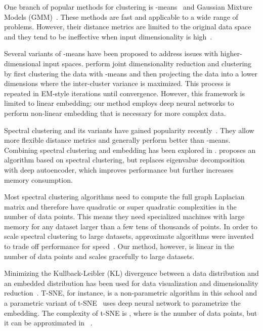 \documentclass{article}
\begin{document}
One branch of popular methods for clustering is -means~\citep{macqueen1967some} and Gaussian Mixture Models (GMM)~\citep{bishop2006pattern}.
These methods are fast and applicable to a wide range of problems.
However, their distance metrics are limited to the original data space and they tend to be ineffective when input dimensionality is high~\citep{steinbach2004challenges}.

Several variants of -means have been proposed to address issues with higher-dimensional input spaces.
\citet{de2006discriminative,ye2008discriminative} perform joint dimensionality reduction and clustering by first clustering the data with -means and then projecting the data into a lower dimensions where the inter-cluster variance is maximized.
This process is repeated in EM-style iterations until convergence.
However, this framework is limited to linear embedding; our method employs deep neural networks to perform non-linear embedding that is necessary for more complex data.

Spectral clustering and its variants have gained popularity recently~\citep{von2007tutorial}.
They allow more flexible distance metrics and generally perform better than -means.
Combining spectral clustering and embedding has been explored in \citet{yang2010image,nie2011spectral}.
\citet{tian2014learning} proposes an algorithm based on spectral clustering, but replaces eigenvalue decomposition with deep autoencoder, which improves performance but further increases memory consumption.

Most spectral clustering algorithms need to compute the full graph Laplacian matrix and therefore have quadratic or super quadratic complexities in the number of data points.
This means they need specialized machines with large memory for any dataset larger than a few tens of thousands of points.
In order to scale spectral clustering to large datasets, approximate algorithms were invented to trade off performance for speed~\citep{yan2009fast}.
Our method, however, is linear in the number of data points and scales gracefully to large datasets.


Minimizing the Kullback-Leibler (KL) divergence between a data distribution and
an embedded distribution has been used for data visualization and dimensionality
reduction~\citep{van2008visualizing}. T-SNE, for instance, is a non-parametric
algorithm in this school and a parametric variant of
t-SNE~\citep{maaten2009learning} uses deep neural network to parametrize the
embedding. The complexity of t-SNE is , where  is the number of data points, but it can be approximated in ~\citep{van2014accelerating}. 
\end{document}
